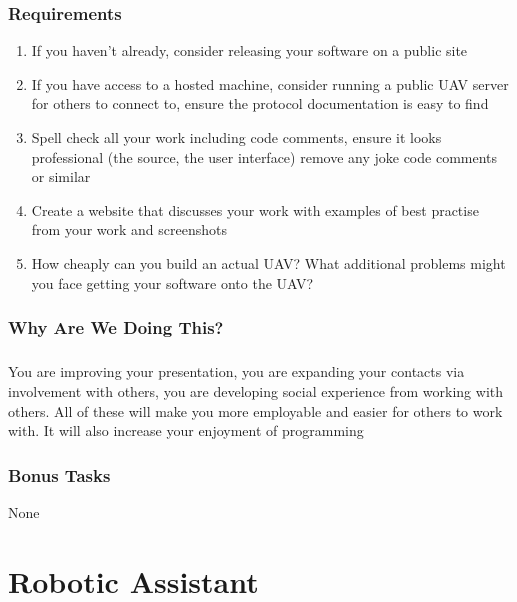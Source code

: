 \documentclass[11pt]{book}
\begin{document}
\subsection{Requirements}

\begin{enumerate}
\item If you haven't already, consider releasing your software on a public site
\item If you have access to a hosted machine, consider running a public UAV server for others to connect to, ensure the protocol documentation is easy to find
\item Spell check all your work including code comments, ensure it looks professional (the source, the user interface) remove any joke code comments or similar
\item Create a website that discusses your work with examples of best practise from your work and screenshots
\item How cheaply can you build an actual UAV? What additional problems might you face getting your software onto the UAV?
\end{enumerate}

\subsection{Why Are We Doing This?}

\paragraph{} You are improving your presentation, you are expanding your
contacts via involvement with others, you are developing social experience
from working with others. All of these will make you more employable and
easier for others to work with. It will also increase your enjoyment of
programming

\subsection{Bonus Tasks}

None

\clearpage


\chapter{Robotic Assistant}
\end{document}
